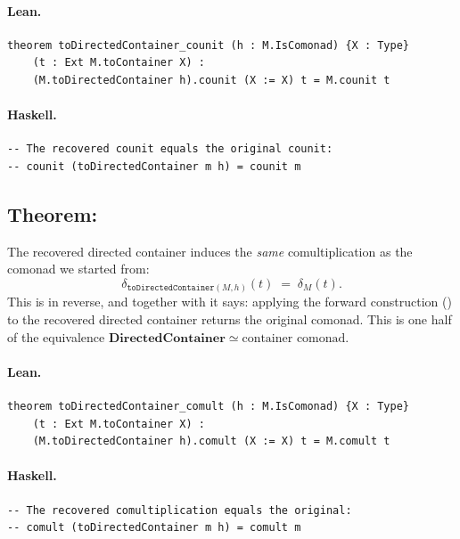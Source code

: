 \documentclass[11pt,a4paper]{article}
\begin{document}
\paragraph{Lean.}
\begin{lstlisting}[style=lean]
theorem toDirectedContainer_counit (h : M.IsComonad) {X : Type}
    (t : Ext M.toContainer X) :
    (M.toDirectedContainer h).counit (X := X) t = M.counit t
\end{lstlisting}

\paragraph{Haskell.}
\begin{lstlisting}[style=haskell]
-- The recovered counit equals the original counit:
-- counit (toDirectedContainer m h) = counit m
\end{lstlisting}


\subsection{Theorem: }

\begin{thm}
The recovered directed container induces the \emph{same} comultiplication as
the comonad we started from:
\[
  \delta_{\mathtt{toDirectedContainer}(M,h)}(t)
  \;=\;
  \delta_M(t).
\]
This is  in reverse, and together with
 it says: applying the forward construction
() to the recovered directed container returns the
original comonad.  This is one half of the equivalence
$\mathbf{DirectedContainer} \simeq \text{container comonad}$.
\end{thm}

\paragraph{Lean.}
\begin{lstlisting}[style=lean]
theorem toDirectedContainer_comult (h : M.IsComonad) {X : Type}
    (t : Ext M.toContainer X) :
    (M.toDirectedContainer h).comult (X := X) t = M.comult t
\end{lstlisting}

\paragraph{Haskell.}
\begin{lstlisting}[style=haskell]
-- The recovered comultiplication equals the original:
-- comult (toDirectedContainer m h) = comult m
\end{lstlisting}
\end{document}
